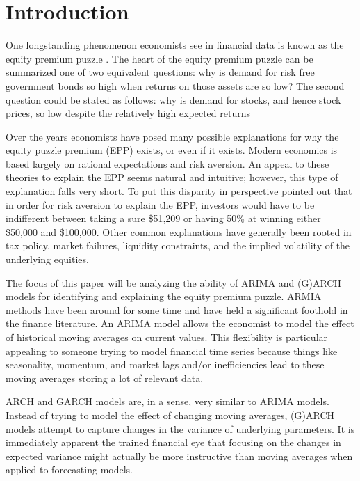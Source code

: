 \documentclass[a4paper, 11pt, twoside]{article}
\theoremstyle{definition} %
\numberwithin{equation}{section}
\begin{document}

\section{Introduction} \label{sec:intro}
  \thispagestyle{empty}
  \pagestyle{mainDoc}

  One longstanding phenomenon economists see in financial data is known as the equity premium puzzle \citep{Prescott:1985}. The heart of the equity premium puzzle can be summarized one of two equivalent questions: why is demand for risk free government bonds so high when returns on those assets are so low? The second question could be stated as follows:  why is demand for stocks, and hence stock prices, so low despite the relatively high expected returns

  Over the years economists have posed many possible explanations for why the equity puzzle premium (EPP) exists, or even if it exists. Modern economics is based largely on rational expectations and risk aversion. An appeal to these theories to explain the EPP seems natural and intuitive; however, this type of explanation falls very short. To put this disparity in perspective \cite{Mankiw:1991} pointed out that in order for risk aversion to explain the EPP, investors would have to be indifferent between taking a sure \$51,209 or having 50\% at winning either \$50,000 and \$100,000. Other common explanations have generally been rooted in tax policy, market failures, liquidity constraints, and the implied volatility of the underlying equities.

  The focus of this paper will be analyzing the ability of ARIMA and (G)ARCH models for identifying and explaining the equity premium puzzle. ARMIA methods have been around for some time and have held a significant foothold in the finance literature.  An ARIMA model allows the economist to model the effect of historical moving averages on current values. This flexibility is particular appealing to someone trying to model financial time series because things like seasonality, momentum, and market lags and/or inefficiencies lead to these moving averages storing a lot of relevant data.

  ARCH and GARCH models are, in a sense, very similar to ARIMA models. Instead of trying to model the effect of changing moving averages, (G)ARCH models attempt to capture changes in the variance of underlying parameters. It is immediately apparent the trained financial eye that focusing on the changes in expected variance might actually be more instructive than moving averages when applied to forecasting models.
\end{document}
